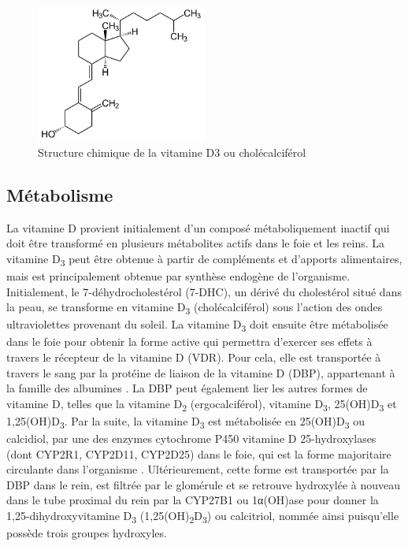 \documentclass[
  letterpaper,
  DIV=11,
  numbers=noendperiod]{scrartcl}
\begin{document}
\begin{figure}

{\centering \includegraphics[width=0.5\textwidth,height=\textheight]{figures/vitamin-d3.png}

}

\caption{\label{fig-vitd3}Structure chimique de la vitamine D3 ou
cholécalciférol}

\end{figure}

\hypertarget{muxe9tabolisme}{%
\subsection{Métabolisme}\label{muxe9tabolisme}}

La vitamine D provient initialement d'un composé métaboliquement inactif
qui doit être transformé en plusieurs métabolites actifs dans le foie et
les reins. La vitamine D\textsubscript{3} peut être obtenue à partir de
compléments et d'apports alimentaires, mais est principalement obtenue
par synthèse endogène de l'organisme. Initialement, le
7-déhydrocholestérol (7-DHC), un dérivé du cholestérol situé dans la
peau, se transforme en vitamine D\textsubscript{3} (cholécalciférol)
sous l'action des ondes ultraviolettes provenant du soleil. La vitamine
D\textsubscript{3} doit ensuite être métabolisée dans le foie pour
obtenir la forme active qui permettra d'exercer ses effets à travers le
récepteur de la vitamine D (VDR). Pour cela, elle est transportée à
travers le sang par la protéine de liaison de la vitamine D (DBP),
appartenant à la famille des albumines
\autocite{Christakos.2010,Chun.2012}. La DBP peut également lier les
autres formes de vitamine D, telles que la vitamine D\textsubscript{2}
(ergocalciférol), vitamine D\textsubscript{3}, 25(OH)D\textsubscript{3}
et 1,25(OH)D\textsubscript{3}. Par la suite, la vitamine
D\textsubscript{3} est métabolisée en 25(OH)D\textsubscript{3} ou
calcidiol, par une des enzymes cytochrome P450 vitamine D
25-hydroxylases (dont CYP2R1, CYP2D11, CYP2D25) dans le foie, qui est la
forme majoritaire circulante dans l'organisme
\autocite{Norman.2008,Christakos.2010}. Ultérieurement, cette forme est
transportée par la DBP dans le rein, est filtrée par le glomérule et se
retrouve hydroxylée à nouveau dans le tube proximal du rein par la
CYP27B1 ou 1α(OH)ase pour donner la 1,25-dihydroxyvitamine
D\textsubscript{3} (1,25(OH)\textsubscript{2}D\textsubscript{3}) ou
calcitriol, nommée ainsi puisqu'elle possède trois groupes hydroxyles.
\end{document}
